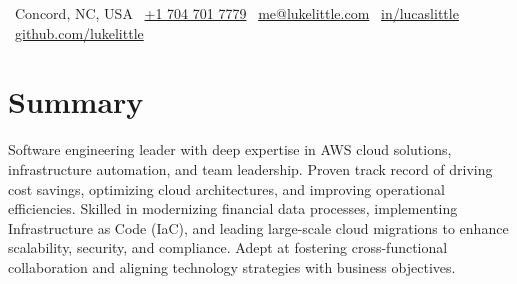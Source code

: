 \documentclass[11pt,letterpaper]{moderncv}
\begin{document}
\makecvtitle

\vspace{-1cm}
\begin{center}
\footnotesize
\faMapMarker*~{Concord, NC, USA} \hspace{0.8em}
\faMobile*~\href{tel:+17047017779}{+1 704 701 7779} \hspace{0.8em}
\faEnvelope~\href{mailto:me@lukelittle.com}{me@lukelittle.com} \hspace{0.8em}
\faLinkedin~\href{https://linkedin.com/in/lucaslittle}{in/lucaslittle} \hspace{0.8em}
\faGithub~\href{https://github.com/lukelittle}{github.com/lukelittle}
\end{center}
\vspace{0.1cm}

\section{Summary}
Software engineering leader with deep expertise in AWS cloud solutions, infrastructure automation, and team leadership. Proven track record of driving cost savings, optimizing cloud architectures, and improving operational efficiencies. Skilled in modernizing financial data processes, implementing Infrastructure as Code (IaC), and leading large-scale cloud migrations to enhance scalability, security, and compliance. Adept at fostering cross-functional collaboration and aligning technology strategies with business objectives.

\end{document}
